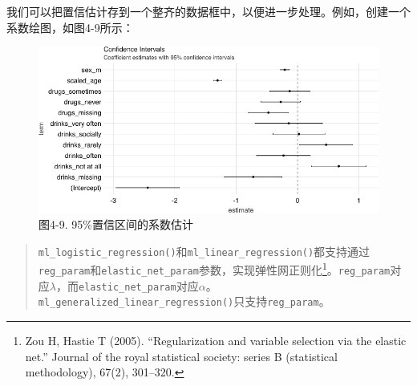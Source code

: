 \documentclass[
]{article}
\newenvironment{Shaded}{\begin{snugshade}}{\end{snugshade}}
\newcommand{\DataTypeTok}[1]{\textcolor[rgb]{0.13,0.29,0.53}{#1}}
\newcommand{\DecValTok}[1]{\textcolor[rgb]{0.00,0.00,0.81}{#1}}
\newcommand{\FloatTok}[1]{\textcolor[rgb]{0.00,0.00,0.81}{#1}}
\newcommand{\KeywordTok}[1]{\textcolor[rgb]{0.13,0.29,0.53}{\textbf{#1}}}
\newcommand{\NormalTok}[1]{#1}
\newcommand{\OperatorTok}[1]{\textcolor[rgb]{0.81,0.36,0.00}{\textbf{#1}}}
\newcommand{\StringTok}[1]{\textcolor[rgb]{0.31,0.60,0.02}{#1}}
\begin{document}
我们可以把置信估计存到一个整齐的数据框中，以便进一步处理。例如，创建一个系数绘图，如图4-9所示：

\begin{Shaded}
\end{Shaded}

\begin{figure}
\centering
\includegraphics{figures/4_9.png}
\caption{图4-9. 95\%置信区间的系数估计}
\end{figure}

\begin{quote}
\texttt{ml\_logistic\_regression()}和\texttt{ml\_linear\_regression()}都支持通过\texttt{reg\_param}和\texttt{elastic\_net\_param}参数，实现弹性网正则化\footnote{Zou
  H, Hastie T (2005). ``Regularization and variable selection via the
  elastic net.'' Journal of the royal statistical society: series B
  (statistical methodology), 67(2), 301--320.}。\texttt{reg\_param}对应\(\lambda\)，而\texttt{elastic\_net\_param}对应\(\alpha\)。\texttt{ml\_generalized\_linear\_regression()}只支持\texttt{reg\_param}。
\end{quote}
\end{document}
